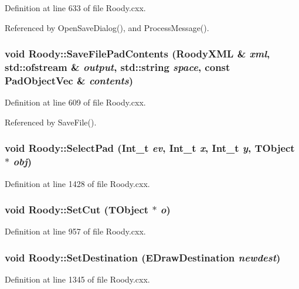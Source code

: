 Definition at line 633 of file Roody.cxx.

Referenced by OpenSaveDialog(), and ProcessMessage().
\subsubsection[{SaveFilePadContents}]{\setlength{\rightskip}{0pt plus 5cm}void Roody::SaveFilePadContents ({\bf RoodyXML} \& {\em xml}, \/  std::ofstream \& {\em output}, \/  std::string {\em space}, \/  const {\bf PadObjectVec} \& {\em contents})\hspace{0.3cm}{\ttfamily  [private]}}\label{classRoody_afdada92b8e8c1e5cedc13fe25c34d258}


Definition at line 609 of file Roody.cxx.

Referenced by SaveFile().
\subsubsection[{SelectPad}]{\setlength{\rightskip}{0pt plus 5cm}void Roody::SelectPad (Int\_\-t {\em ev}, \/  Int\_\-t {\em x}, \/  Int\_\-t {\em y}, \/  TObject $\ast$ {\em obj})}\label{classRoody_a70e41616c36d9ff38cf218190700f959}


Definition at line 1428 of file Roody.cxx.
\subsubsection[{SetCut}]{\setlength{\rightskip}{0pt plus 5cm}void Roody::SetCut (TObject $\ast$ {\em o})}\label{classRoody_a0129eed5885cc254ecf57a5fd4d6dde1}


Definition at line 957 of file Roody.cxx.
\subsubsection[{SetDestination}]{\setlength{\rightskip}{0pt plus 5cm}void Roody::SetDestination ({\bf EDrawDestination} {\em newdest})\hspace{0.3cm}{\ttfamily  [private]}}\label{classRoody_a94778428d8c13d8b7e9599e5aa8ffd2d}


Definition at line 1345 of file Roody.cxx.

